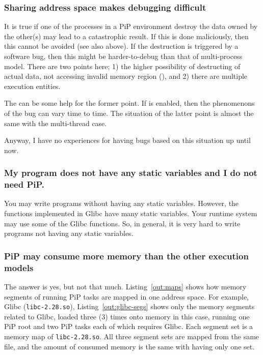 \subsubsection*{Sharing address space makes debugging difficult}

It is true if one of the processes in a PiP environment destroy the
data owned by the other(s) may lead to a catastrophic result. If this
is done maliciously, then this cannot be avoided (see also
above). If the destruction is triggered by a
software bug, then this might be harder-to-debug than that of
multi-process model.  There are two points here; 1) the higher 
possibility of destructing of actual data, not accessing invalid memory
region (), and 2) there are multiple execution entities.

The  can be some help for the former point. If 
is enabled, then the phenomenons of the bug can vary time to time. The
situation of the latter point is almost the same with the multi-thread case.

Anyway, I have no experiences for having bugs based on this situation
up until now. 

\subsubsection*{My program does not have any static variables and I do
  not need PiP.}

You may write programs without having any static variables. However,
the functions implemented in Glibc have many static variables. Your
runtime system may use some of the Glibc functions. So, in general, it
is very hard to write programs not having any static variables.

\subsubsection*{PiP may consume more memory than the other execution
  models}

The answer is yes, but not that much. Listing~\ref{out:maps} shows
how memory segments of running PiP tasks are mapped in one address
space. For example, Glibc ({\tt libc-2.28.so}),
Listing~\ref{out:glibc-segs} shows only the memory segments related to
Glibc, loaded three (3) times onto memory in this case, running one
PiP root and two PiP tasks each of which requires Glibc. Each segment
set is a memory map of {\tt libc-2.28.so}. All three segment sets are 
mapped from the same file, and the amount of consumed memory is the
same with having only one set. 

